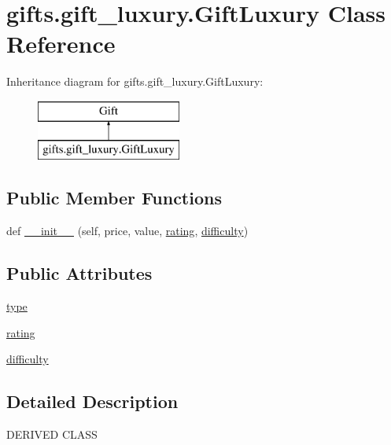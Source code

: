 \hypertarget{classgifts_1_1gift__luxury_1_1_gift_luxury}{}\section{gifts.\+gift\+\_\+luxury.\+Gift\+Luxury Class Reference}
\label{classgifts_1_1gift__luxury_1_1_gift_luxury}
Inheritance diagram for gifts.\+gift\+\_\+luxury.\+Gift\+Luxury\+:\begin{figure}[H]
\begin{center}
\leavevmode
\includegraphics[height=2.000000cm]{classgifts_1_1gift__luxury_1_1_gift_luxury}
\end{center}
\end{figure}
\subsection*{Public Member Functions}
\begin{DoxyCompactItemize}
\item 
def \hyperlink{classgifts_1_1gift__luxury_1_1_gift_luxury_a6e182943e81f2c60258a58f5407331e7}{\+\_\+\+\_\+init\+\_\+\+\_\+} (self, price, value, \hyperlink{classgifts_1_1gift__luxury_1_1_gift_luxury_ae198823fa402656c7df8d3730214f9f4}{rating}, \hyperlink{classgifts_1_1gift__luxury_1_1_gift_luxury_ac409c88a37425dfbf8375da128032708}{difficulty})
\end{DoxyCompactItemize}
\subsection*{Public Attributes}
\begin{DoxyCompactItemize}
\item 
\hyperlink{classgifts_1_1gift__luxury_1_1_gift_luxury_a396a3f85420d5b5e0809a7fc51cbd37a}{type}
\item 
\hyperlink{classgifts_1_1gift__luxury_1_1_gift_luxury_ae198823fa402656c7df8d3730214f9f4}{rating}
\item 
\hyperlink{classgifts_1_1gift__luxury_1_1_gift_luxury_ac409c88a37425dfbf8375da128032708}{difficulty}
\end{DoxyCompactItemize}


\subsection{Detailed Description}
\begin{DoxyVerb}DERIVED CLASS\end{DoxyVerb}
 

